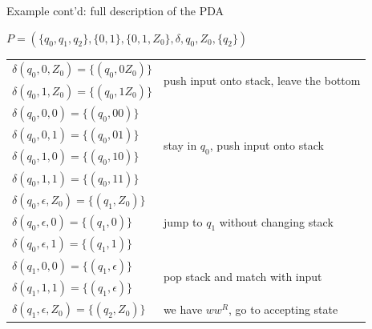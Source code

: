 \documentclass[handout]{beamer}
\begin{document}
\begin{frame}{Example cont'd: full description of the PDA}

    \begin{center}
        $P=(\{q_0,q_1,q_2\},\{0,1\},\{0,1,Z_0\},\delta,q_0,Z_0,\{q_2\})$
    \end{center}

    \begin{tabular}{l l}\hline
        $\delta(q_0,0,Z_0)=\{(q_0,0Z_0)\}$ &  
            \multirow{2}{*}{push input onto stack, leave the bottom} \\
        $\delta(q_0,1,Z_0)=\{(q_0,1Z_0)\}$ &  \\\hline
        $\delta(q_0,0,0)=\{(q_0,00)\}$ &  
            \multirow{4}{*}{stay in $q_0$, push input onto stack}\\ 
        $\delta(q_0,0,1)=\{(q_0,01)\}$ \\
        $\delta(q_0,1,0)=\{(q_0,10)\}$ \\
        $\delta(q_0,1,1)=\{(q_0,11)\}$ \\ \hline
        $\delta(q_0,\epsilon,Z_0)=\{(q_1,Z_0)\}$ &
            \multirow{3}{*}{jump to $q_1$ without changing stack}\\ 
        $\delta(q_0,\epsilon,0)=\{(q_1,0)\}$ \\
        $\delta(q_0,\epsilon,1)=\{(q_1,1)\}$ \\ \hline
        $\delta(q_1,0,0)=\{(q_1,\epsilon)\}$ &
            \multirow{2}{*}{pop stack and match with input}\\ 
        $\delta(q_1,1,1)=\{(q_1,\epsilon)\}$ \\ \hline
        $\delta(q_1,\epsilon,Z_0)=\{(q_2,Z_0)\}$ & we have $ww^R$, go to accepting state
        \\\hline
    \end{tabular}

\end{frame}
\end{document}
